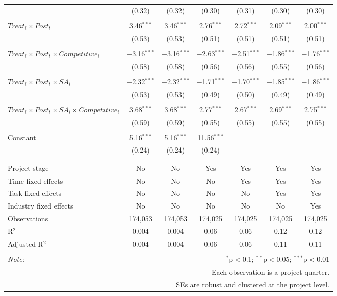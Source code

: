 \documentclass[
]{article}
\begin{document}
\begin{table}[H]
\begin{tabular}{@{\extracolsep{-3pt}}lcccccc}
  & (0.32) & (0.32) & (0.30) & (0.31) & (0.30) & (0.30) \\ 
  & & & & & & \\ 
 $Treat_i \times Post_t$ & 3.46$^{***}$ & 3.46$^{***}$ & 2.76$^{***}$ & 2.72$^{***}$ & 2.09$^{***}$ & 2.00$^{***}$ \\ 
  & (0.53) & (0.53) & (0.51) & (0.51) & (0.51) & (0.51) \\ 
  & & & & & & \\ 
 $Treat_i \times Post_t \times Competitive_i$ & $-$3.16$^{***}$ & $-$3.16$^{***}$ & $-$2.63$^{***}$ & $-$2.51$^{***}$ & $-$1.86$^{***}$ & $-$1.76$^{***}$ \\ 
  & (0.58) & (0.58) & (0.56) & (0.56) & (0.55) & (0.56) \\ 
  & & & & & & \\ 
 $Treat_i \times Post_t \times SA_i$ & $-$2.32$^{***}$ & $-$2.32$^{***}$ & $-$1.71$^{***}$ & $-$1.70$^{***}$ & $-$1.85$^{***}$ & $-$1.86$^{***}$ \\ 
  & (0.53) & (0.53) & (0.49) & (0.50) & (0.49) & (0.49) \\ 
  & & & & & & \\ 
 $Treat_i \times Post_t \times SA_i \times Competitive_i$ & 3.68$^{***}$ & 3.68$^{***}$ & 2.77$^{***}$ & 2.67$^{***}$ & 2.69$^{***}$ & 2.75$^{***}$ \\ 
  & (0.59) & (0.59) & (0.55) & (0.55) & (0.55) & (0.55) \\ 
  & & & & & & \\ 
 Constant & 5.16$^{***}$ & 5.16$^{***}$ & 11.56$^{***}$ &  &  &  \\ 
  & (0.24) & (0.24) & (0.24) &  &  &  \\ 
  & & & & & & \\ 
\hline \\[-1.8ex] 
Project stage & No & No & Yes & Yes & Yes & Yes \\ 
Time fixed effects & No & No & No & Yes & Yes & Yes \\ 
Task fixed effects & No & No & No & No & Yes & Yes \\ 
Industry fixed effects & No & No & No & No & No & Yes \\ 
Observations & 174,053 & 174,053 & 174,025 & 174,025 & 174,025 & 174,025 \\ 
R$^{2}$ & 0.004 & 0.004 & 0.06 & 0.06 & 0.12 & 0.12 \\ 
Adjusted R$^{2}$ & 0.004 & 0.004 & 0.06 & 0.06 & 0.11 & 0.11 \\ 
\hline 
\hline \\[-1.8ex] 
\textit{Note:}  & \multicolumn{6}{r}{$^{*}$p$<$0.1; $^{**}$p$<$0.05; $^{***}$p$<$0.01} \\ 
 & \multicolumn{6}{r}{Each observation is a project-quarter.} \\ 
 & \multicolumn{6}{r}{SEs are robust and clustered at the project level.} \\ 
\end{tabular} 
\end{table}
\end{document}
